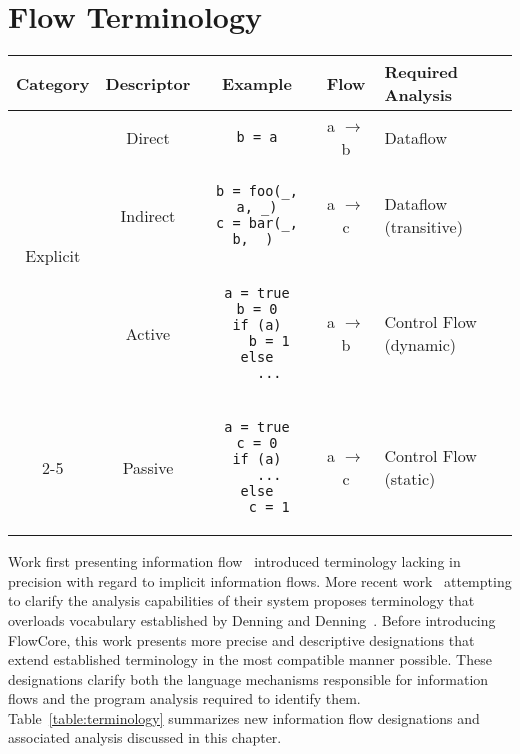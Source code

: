 \chapter{Flow Terminology}

\label{sec:terminology}

\begin{table*}
\centering
\begin{tabular}{ccccm{2.5cm}}
\toprule
Category & Descriptor & Example & Flow & Required Analysis \\
\midrule[\heavyrulewidth]
\multirow{3}{*}{Explicit} & Direct &
\begin{lstlisting}
b = a
\end{lstlisting} & a $\rightarrow$ b & Dataflow\\
\cmidrule(r){2-5} & Indirect &
\begin{lstlisting}
b = foo(_, a, _)
c = bar(_, b, _) 
\end{lstlisting}
& a $\rightarrow$ c & Dataflow (transitive) \\
\hline
\multirow{7}{*}{Implicit} & Active &
\begin{lstlisting}
a = true
b = 0
if (a)
   b = 1
else
   ...
\end{lstlisting}
& a $\rightarrow$ b & Control Flow (dynamic)\\
\cmidrule(r){2-5} & Passive &
\begin{lstlisting}
a = true
c = 0
if (a)
   ...
else
   c = 1
\end{lstlisting}
& a $\rightarrow$ c & Control Flow (static)\\
\bottomrule
\end{tabular}
\caption{Terminology of Information Flows.}
\label{table:terminology}
\end{table*}

Work first presenting information flow~\cite{denning-cert} introduced terminology lacking in precision with regard to implicit information flows.
More recent work~\cite{empirical-study} attempting to clarify the analysis capabilities of their system proposes terminology that overloads vocabulary established by Denning and Denning~\cite{denning-cert}.
Before introducing FlowCore, this work presents more precise and descriptive designations that extend established terminology in the most compatible manner possible.
These designations clarify both the language mechanisms responsible for information flows and the program analysis required to identify them.
Table~\ref{table:terminology} summarizes new information flow designations and associated analysis discussed in this chapter.

